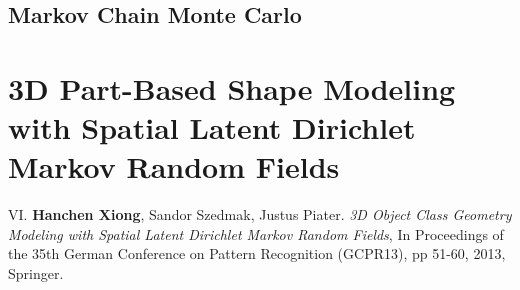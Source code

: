\subsection{Markov Chain Monte Carlo}



\section{3D Part-Based Shape Modeling with Spatial Latent Dirichlet Markov Random Fields}
\begin{shaded}
{\Huge VI.} \textbf{Hanchen Xiong}, Sandor Szedmak, Justus Piater. {\it 3D Object Class Geometry Modeling with Spatial Latent Dirichlet Markov Random Fields}, In Proceedings of the 35th German Conference on Pattern Recognition (GCPR13), pp 51-60, 2013,  Springer.  
\vspace{-.2cm}

\end{shaded}

